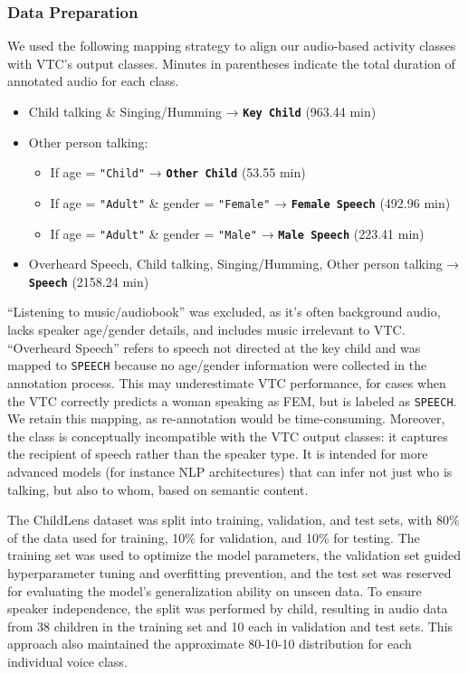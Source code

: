 \documentclass[
  man,floatsintext]{apa6}
\providecommand{\tightlist}{%
  \setlength{\itemsep}{0pt}\setlength{\parskip}{0pt}}
\begin{document}
\subsubsection{Data Preparation}\label{data-preparation-1}

We used the following mapping strategy to align our audio-based activity classes with VTC's output classes. Minutes in parentheses indicate the total duration of annotated audio for each class.

\begin{itemize}
\tightlist
\item
  Child talking \& Singing/Humming → \textbf{\texttt{Key\ Child}} (963.44 min)
\item
  Other person talking:

  \begin{itemize}
  \tightlist
  \item
    If age = \texttt{"Child"} → \textbf{\texttt{Other\ Child}} (53.55 min)
  \item
    If age = \texttt{"Adult"} \& gender = \texttt{"Female"} → \textbf{\texttt{Female\ Speech}} (492.96 min)
  \item
    If age = \texttt{"Adult"} \& gender = \texttt{"Male"} → \textbf{\texttt{Male\ Speech}} (223.41 min)
  \end{itemize}
\item
  Overheard Speech, Child talking, Singing/Humming, Other person talking → \textbf{\texttt{Speech}} (2158.24 min)
\end{itemize}

``Listening to music/audiobook'' was excluded, as it's often background audio, lacks speaker age/gender details, and includes music irrelevant to VTC. ``Overheard Speech'' refers to speech not directed at the key child and was mapped to \texttt{SPEECH} because no age/gender information were collected in the annotation process. This may underestimate VTC performance, for cases when the VTC correctly predicts a woman speaking as FEM, but is labeled as \texttt{SPEECH}. We retain this mapping, as re-annotation would be time-consuming. Moreover, the class is conceptually incompatible with the VTC output classes: it captures the recipient of speech rather than the speaker type. It is intended for more advanced models (for instance NLP architectures) that can infer not just who is talking, but also to whom, based on semantic content.

The ChildLens dataset was split into training, validation, and test sets, with 80\% of the data used for training, 10\% for validation, and 10\% for testing. The training set was used to optimize the model parameters, the validation set guided hyperparameter tuning and overfitting prevention, and the test set was reserved for evaluating the model's generalization ability on unseen data. To ensure speaker independence, the split was performed by child, resulting in audio data from 38 children in the training set and 10 each in validation and test sets. This approach also maintained the approximate 80-10-10 distribution for each individual voice class.
\end{document}
